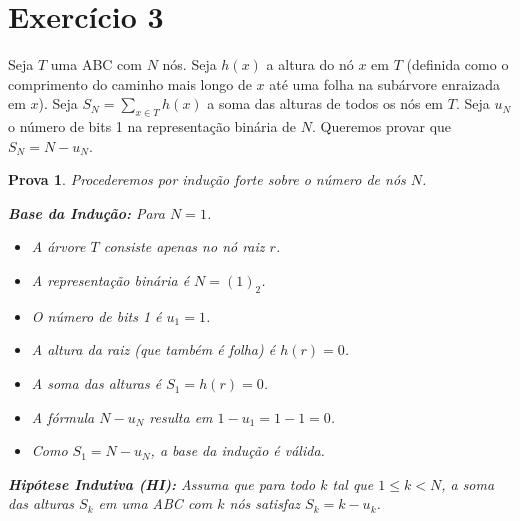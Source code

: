 \documentclass[11pt,reqno,a4paper]{amsart}
\theoremstyle{prova_style}
\newtheorem*{prova}{Prova} %
\begin{document}
\newpage

\section{Exercício 3}
Seja $T$ uma ABC com $N$ nós. Seja $h(x)$ a altura do nó $x$ em $T$ (definida como o comprimento do caminho mais longo de $x$ até uma folha na subárvore enraizada em $x$). Seja $S_N = \sum_{x \in T} h(x)$ a soma das alturas de todos os nós em $T$. Seja $u_N$ o número de bits 1 na representação binária de $N$. Queremos provar que $S_N = N - u_N$.

\begin{prova}
Procederemos por indução forte sobre o número de nós $N$.

\textbf{Base da Indução:} Para $N=1$.
\begin{itemize}
    \item A árvore $T$ consiste apenas no nó raiz $r$.
    \item A representação binária é $N=(1)_2$.
    \item O número de bits 1 é $u_1 = 1$.
    \item A altura da raiz (que também é folha) é $h(r)=0$.
    \item A soma das alturas é $S_1 = h(r) = 0$.
    \item A fórmula $N - u_N$ resulta em $1 - u_1 = 1 - 1 = 0$.
    \item Como $S_1 = N - u_N$, a base da indução é válida.
\end{itemize}

\textbf{Hipótese Indutiva (HI):} Assuma que para todo $k$ tal que $1 \le k < N$, a soma das alturas $S_k$ em uma ABC com $k$ nós satisfaz $S_k = k - u_k$.


\end{prova}
\end{document}
